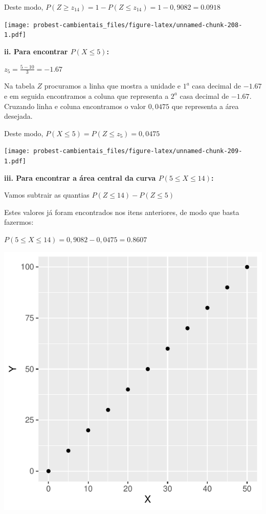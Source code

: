 \documentclass[
]{book}
\begin{document}
Deste modo, \(P(Z \ge z_{14}) = 1 - P(Z \le z_{14}) = 1 - 0,9082 = 0.0918\)

\texttt{[image: probest-cambientais\_files/figure-latex/unnamed-chunk-208-1.pdf]}

\textbf{ii. Para encontrar \(P(X \le 5)\):}

\(z_{5} = \frac{5 - 10}{3} = -1.67\)

Na tabela \(Z\) procuramos a linha que mostra a unidade e \(1^a\) casa decimal de \(-1.67\) e em seguida encontramos a coluna que representa a \(2^a\) casa decimal de \(-1.67\). Cruzando linha e coluna encontramos o valor \(0,0475\) que representa a área desejada.

Deste modo, \(P(X \le 5) = P(Z \le z_{5}) = 0,0475\)

\texttt{[image: probest-cambientais\_files/figure-latex/unnamed-chunk-209-1.pdf]}

\textbf{iii. Para encontrar a área central da curva \(P(5 \le X \le 14)\):}

Vamos subtrair as quantias \(P(Z \le 14) - P(Z \le 5)\)

Estes valores já foram encontrados nos itens anteriores, de modo que basta fazermos:

\(P(5 \le X \le 14) = 0,9082 - 0,0475 = 0.8607\)

\includegraphics{probest-cambientais_files/figure-latex/unnamed-chunk-210-1.pdf}
\end{document}
